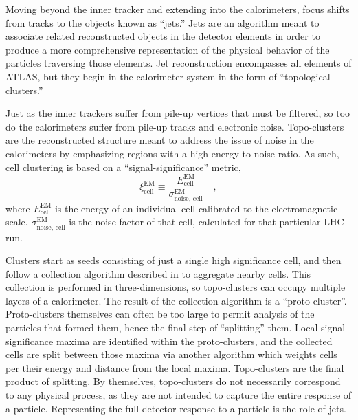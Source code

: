         Moving beyond the inner tracker and extending into the calorimeters,
            focus shifts from tracks to the objects known as ``jets.''
        Jets are an algorithm meant to associate related reconstructed objects in the detector elements
            in order to produce a more comprehensive representation of the physical behavior of the particles traversing those elements.
        Jet reconstruction encompasses all elements of ATLAS,
            but they begin in the calorimeter system in the form of ``topological clusters.''

        Just as the inner trackers suffer from pile-up vertices that must be filtered,
            so too do the calorimeters suffer from pile-up tracks and electronic noise.
        Topo-clusters are the reconstructed structure meant to address the issue of noise in the calorimeters
            by emphasizing regions with a high energy to noise ratio.
        As such, cell clustering is based on a ``signal-significance'' metric,
        \begin{equation}
            \xi^{\textrm{EM}}_{\textrm{cell}} \equiv \frac{
                E^{\textrm{EM}}_{\textrm{cell}} }{
                \sigma^{\textrm{EM}}_{\textrm{noise, cell}} } \quad,
        \end{equation}
            where $E^{\textrm{EM}}_{\textrm{cell}}$ is the energy of an individual cell calibrated to the electromagnetic scale.
        $\sigma^{\textrm{EM}}_{\textrm{noise, cell}}$ is the noise factor of that cell, calculated for that particular LHC run.

        Clusters start as seeds consisting of just a single high significance cell,
            and then follow a collection algorithm described in \cite{cell_clustering} to aggregate nearby cells.
        This collection is performed in three-dimensions, so topo-clusters can occupy multiple layers of a calorimeter.
        The result of the collection algorithm is a ``proto-cluster''.
        Proto-clusters themselves can often be too large to permit analysis of the particles that formed them,
            hence the final step of ``splitting'' them.
        Local signal-significance maxima are identified within the proto-clusters,
            and the collected cells are split between those maxima via another algorithm
            which weights cells per their energy and distance from the local maxima.
        Topo-clusters are the final product of splitting.
        By themselves, topo-clusters do not necessarily correspond to any physical process,
            as they are not intended to capture the entire response of a particle.
        Representing the full detector response to a particle is the role of jets.

